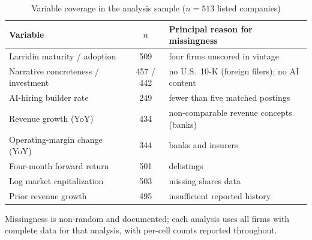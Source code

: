 \documentclass[11pt]{article}
\begin{document}
\begin{table}[H]
\centering
\begin{threeparttable}
\caption{Variable coverage in the analysis sample ($n=513$ listed companies)}
\label{tab:coverage}
\small
\begin{tabular}{lcl}
\toprule
Variable & $n$ & Principal reason for missingness\\
\midrule
Larridin maturity / adoption & 509 & four firms unscored in vintage\\
Narrative concreteness / investment & 457 / 442 & no U.S.\ 10-K (foreign filers); no AI content\\
AI-hiring builder rate & 249 & fewer than five matched postings\\
Revenue growth (YoY) & 434 & non-comparable revenue concepts (banks)\\
Operating-margin change (YoY) & 344 & banks and insurers\\
Four-month forward return & 501 & delistings\\
Log market capitalization & 503 & missing shares data\\
Prior revenue growth & 495 & insufficient reported history\\
\bottomrule
\end{tabular}
\begin{tablenotes}\footnotesize
\item Missingness is non-random and documented; each analysis uses all firms
with complete data for that analysis, with per-cell counts reported throughout.
\end{tablenotes}
\end{threeparttable}
\end{table}
\end{document}
